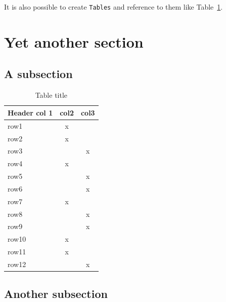 \blindtext

\blindtext

It is also possible to create \texttt{Tables} and reference to them like Table~\ref{tab:Table}.

\section{Yet another section}

\blindtext 

\subsection{A subsection}

\blindtext 

\begin{table}[htb]
	\centering
	\caption{Table title}\smallskip
	\begin{tabular}{|l|c|c|} \hline
		Header col 1 & col2 & col3 \\ \hline
		row1 &x &\\ \hline
		row2 &x &\\ \hline
		row3 &&x\\ \hline
		row4 &x &\\ \hline
		row5 &&x\\ \hline
		row6 &&x\\ \hline
		row7 &x &\\ \hline
		row8 &&x\\ \hline
		row9 &&x\\ \hline
		row10 &x &\\ \hline
		row11 &x &\\ \hline
		row12 &&x\\ \hline
	\end{tabular}
	\label{tab:Table}
\end{table}

\blindtext
\blindtext

\subsection{Another subsection}

\blindtext